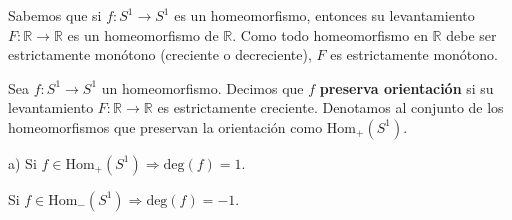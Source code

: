 \begin{observacion}
	Sabemos que si $f: S^1 \to S^1$ es un homeomorfismo, entonces su levantamiento $F: \mathbb{R} \to \mathbb{R}$ es un homeomorfismo de $\mathbb{R}$. 
	Como todo homeomorfismo en $\mathbb{R}$ debe ser estrictamente monótono (creciente o decreciente), $F$ es estrictamente monótono.
\end{observacion}

\begin{definicion}
	Sea $f: S^1 \to S^1$ un homeomorfismo. Decimos que $f$ \textbf{preserva orientación} si su levantamiento $F: \mathbb{R} \to \mathbb{R}$ es estrictamente creciente.
	Denotamos al conjunto de los homeomorfismos que preservan la orientación como $\text{Hom}_+(S^1)$.
\end{definicion}

\begin{proposicion}
	a) Si $f \in \text{Hom}_+(S^1) \Rightarrow \text{deg}(f) = 1$.
	
	Si $f \in \text{Hom}_-(S^1) \Rightarrow \text{deg}(f) = -1$.
\end{proposicion}
